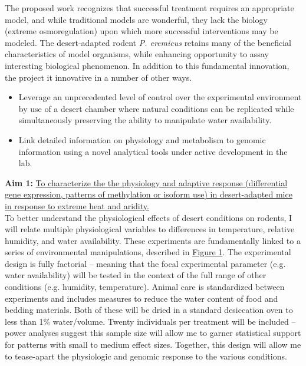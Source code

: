 \documentclass[11pt]{article}
\begin{document}
The proposed work recognizes that successful treatment requires an appropriate model, and while traditional models are wonderful, they lack the biology (extreme osmoregulation) upon which more successful interventions may be modeled. The desert-adapted rodent \textit{P. eremicus} retains many of the beneficial characteristics of model organisms, while enhancing opportunity to assay interesting biological phenomenon. In addition to this fundamental innovation, the project it innovative in a number of other ways.
\begin{itemize}
\item Leverage an unprecedented level of control over the experimental environment by use of a desert chamber where natural conditions can be replicated while simultaneously preserving the ability to manipulate water availability. 
\item Link detailed information on physiology and metabolism to genomic information using a novel analytical tools under active development in the lab.
\end{itemize}

 

\newpage

\linespread{1.2}

\noindent \textbf{Aim 1:} \ul{To characterize the the physiology and adaptive response (differential gene expression, patterns of methylation or isoform use) in desert-adapted mice in response to extreme heat and aridity.} \\

To better understand the physiological effects of desert conditions on rodents, I will relate multiple physiological variables to differences in temperature, relative humidity, and water availability. These experiments are fundamentally linked to a series of environmental manipulations, described in \hyperlink{Figure 1}{Figure 1}. The experimental design is fully factorial -- meaning that the focal experimental parameter (e.g. water availability) will be tested in the context of the full range of other conditions (e.g. humidity, temperature). Animal care is standardized between experiments and includes measures to reduce the water content of food and bedding materials. Both of these will be dried in a standard desiccation oven to less than 1\% water/volume. Twenty individuals per treatment will be included -- power analyses suggest this sample size will allow me to garner statistical support for patterns with small to medium effect sizes. Together, this design will allow me to tease-apart the physiologic and genomic response to the various conditions. \\
\end{document}
